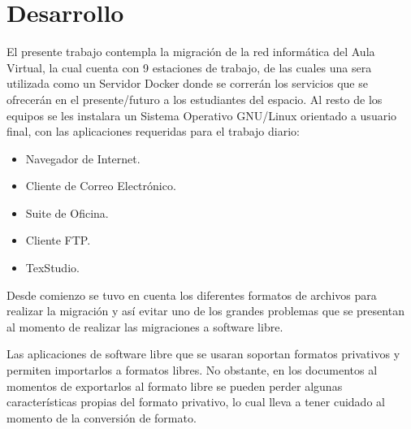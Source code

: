 \chapter{Desarrollo}\label{ch:desarrollo}
	
	El presente trabajo contempla la migración de la red informática del Aula Virtual, la cual cuenta con 9 estaciones de trabajo, de las cuales una sera utilizada como un Servidor Docker donde se correrán los servicios que se ofrecerán en el presente/futuro a los estudiantes del espacio. Al resto de los equipos se les instalara un Sistema Operativo GNU/Linux orientado a usuario final, con las aplicaciones requeridas para el trabajo diario:\par
	
	\begin{itemize}
		
		\item Navegador de Internet.
		
		\item Cliente de Correo Electrónico.
		
		\item Suite de Oficina.
		
		\item Cliente FTP. 
		
		\item TexStudio.
				
	\end{itemize}
	
	Desde comienzo se tuvo en cuenta los diferentes formatos de archivos para realizar la migración y así evitar uno de los grandes problemas que se presentan al momento de realizar las migraciones a software libre.\par
	
	Las aplicaciones de software libre que se usaran soportan formatos privativos y permiten importarlos a formatos libres. No obstante, en los documentos al momentos de exportarlos al formato libre se pueden perder algunas características propias del formato privativo, lo cual lleva a tener cuidado al momento de la conversión de formato.\par
	
